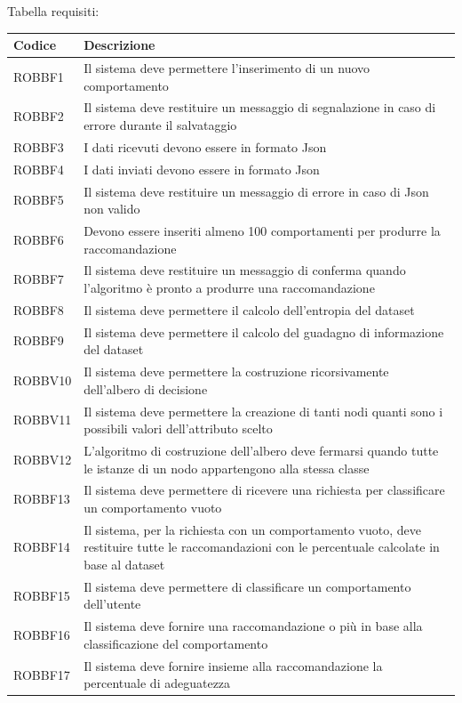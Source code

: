 Tabella requisiti:
\def\arraystretch{1.8}
\begin{longtable}{|l|p{7cm}|}
\hline
\textbf{Codice} &	\textbf{Descrizione}	\\\hline
ROBBF1	&	Il sistema deve permettere l'inserimento di un nuovo comportamento	\\\hline
ROBBF2	&	Il sistema deve restituire un messaggio di segnalazione in caso di errore durante il salvataggio \\\hline
ROBBF3	&	I dati ricevuti devono essere in formato Json \\\hline
ROBBF4	&	I dati inviati devono essere in formato Json \\\hline
ROBBF5	&	Il sistema deve restituire un messaggio di errore in caso di Json non valido \\\hline
ROBBF6	&	Devono essere inseriti almeno 100 comportamenti per produrre la raccomandazione \\\hline
ROBBF7	&	Il sistema deve restituire un messaggio di conferma quando l'algoritmo è pronto a produrre una raccomandazione	\\\hline
ROBBF8	&	Il sistema deve permettere il calcolo dell'entropia del dataset \\\hline
ROBBF9	&	Il sistema deve permettere il calcolo del guadagno di informazione del dataset	\\\hline
ROBBV10	&	Il sistema deve permettere la costruzione ricorsivamente dell'albero di decisione	\\\hline
ROBBV11	&	Il sistema deve permettere la creazione di tanti nodi quanti sono i possibili valori dell'attributo scelto \\\hline
ROBBV12	&	L'algoritmo di costruzione dell'albero deve fermarsi quando tutte le istanze di un nodo appartengono alla stessa classe \\\hline
ROBBF13	&	Il sistema deve permettere di ricevere una richiesta per classificare un comportamento vuoto \\\hline
ROBBF14	&	Il sistema, per la richiesta con un comportamento vuoto, deve restituire tutte le raccomandazioni con le percentuale calcolate in base al dataset \\\hline
ROBBF15	&	Il sistema deve permettere di classificare un comportamento dell'utente \\\hline
ROBBF16	&	Il sistema deve fornire una raccomandazione o più in base alla classificazione del comportamento \\\hline
ROBBF17	&	Il sistema deve fornire insieme alla raccomandazione la percentuale di adeguatezza	\\\hline

\end{longtable}
